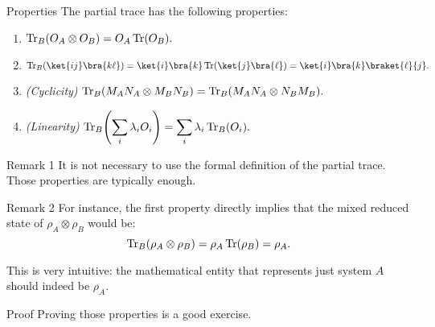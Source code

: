 \documentclass[a4paper]{article}
\begin{document}
\begin{parag}{Properties}
    The partial trace has the following properties:
    \begin{enumerate}
        \item $\displaystyle \Tr_B\left(O_A \otimes O_B\right) = O_A \Tr\left(O_B\right).$
        \item $\displaystyle \Tr_B\left(\ket{ij}\bra{k\ell}\right) = \ket{i}\bra{k} \Tr\left(\ket{j}\bra{\ell}\right) = \ket{i}\bra{k} \braket{\ell}{j}.$
        \item \textit{(Cyclicity)} $\displaystyle \Tr_B\left(M_A N_A \otimes M_B N_B\right) = \Tr_B\left(M_A N_A \otimes N_B M_B\right).$
        \item \textit{(Linearity)} $\displaystyle \Tr_B\left(\sum_{i} \lambda_i O_i\right) = \sum_{i} \lambda_i \Tr_B\left(O_i\right).$
    \end{enumerate}
    
    \begin{subparag}{Remark 1}
        It is not necessary to use the formal definition of the partial trace. Those properties are typically enough.
    \end{subparag}

    \begin{subparag}{Remark 2}
        For instance, the first property directly implies that the mixed reduced state of $\rho_A \otimes \rho_B$ would be:
        \[\Tr_B\left(\rho_A \otimes \rho_B\right) = \rho_A \Tr\left(\rho_B\right) = \rho_A.\]

        This is very intuitive: the mathematical entity that represents just system $A$ should indeed be $\rho_A$.
    \end{subparag}

    \begin{subparag}{Proof}
        Proving those properties is a good exercise.
    \end{subparag}
\end{parag}
\end{document}
